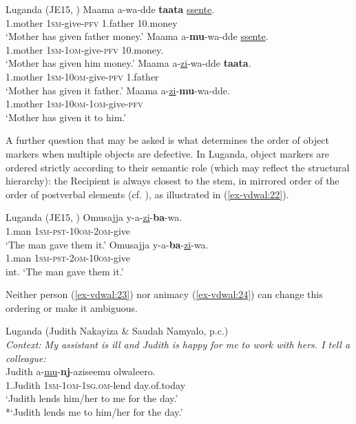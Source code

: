 \documentclass[output=paper
,modfonts
,nonflat]{langsci/langscibook}
\begin{document}
\begin{exe}
\ex	Luganda (JE15, \citealt[67, 72]{Ssekiryango2006}) \label{ex-vdwal:21}
	\xlist
	\ex \label{ex-vdwal:21a}
		\gll Maama a-wa-dde \textbf{taata} \uline{ssente}.\\
		1.mother \textsc{1sm}-give-\textsc{pfv} 1.father 10.money \\ 
		\glt `Mother has given father money.'
	\ex  \label{ex-vdwal:21b}
		\gll  Maama a-\textbf{mu}-wa-dde \uline{ssente}. \\
		1.mother \textsc{1sm}-\textsc{1om}-give-\textsc{pfv} 10.money. \\
		\glt `Mother has given him money.'
	\ex  \label{ex-vdwal:21c}
		\gll Maama a-\uline{zi}-wa-dde \textbf{taata}.\\
		1.mother \textsc{1sm}-\textsc{10om-}give-\textsc{pfv} 1.father\\
		\glt `Mother has given it father.'
	\ex  \label{ex-vdwal:21d}
		\gll Maama a-\uline{zi}-\textbf{mu}-wa-dde.\\
		1.mother \textsc{1sm}-\textsc{10om-1om-}give-\textsc{pfv}\\  
		\glt `Mother has given it to him.'
	\endxlist
\end{exe}
A further question that may be asked is what determines the order of object markers when multiple objects are defective. In Luganda, object markers are ordered strictly according to their semantic role (which may reflect the structural hierarchy): the Recipient is always closest to the stem, in mirrored order of the order of postverbal elements (cf. \citealt{Baker1985, Baker1988}), as illustrated in (\ref{ex-vdwal:22}).

\begin{exe}
\ex	Luganda (JE15, \citealt[13]{Ranero2015}) \label{ex-vdwal:22}
	\xlist
		\ex	
			\gll Omusajja y-a-\uline{zi}-\textbf{ba}-wa.\\
			1.man \textsc{1sm-pst-10om-2om}-give\\
			\glt `The man gave them it.'
		\ex 
			\gll *Omusajja y-a-\textbf{ba}-\uline{zi}-wa.\\
			1.man \textsc{1sm-pst-2om-10om}-give\\
			\glt int. `The man gave them it.'
	\endxlist
\end{exe}
Neither person (\ref{ex-vdwal:23}) nor animacy (\ref{ex-vdwal:24}) can change this ordering or make it ambiguous.

\begin{exe}
\ex	Luganda (Judith Nakayiza \& Saudah Namyalo, p.c.) \label{ex-vdwal:23}\\ 
\textit{Context: My assistant is ill and Judith is happy for me to work with hers. I tell a colleague:}\\
		\gll Judith a-\uline{mu}-\textbf{nj}-aziseemu olwaleero.\\
		1.Judith \textsc{1sm-1om-1sg.om}-lend day.of.today\\
		\glt `Judith lends him/her to me for the day.'\\
		*`Judith lends me to him/her for the day.'
\end{exe}
\end{document}
